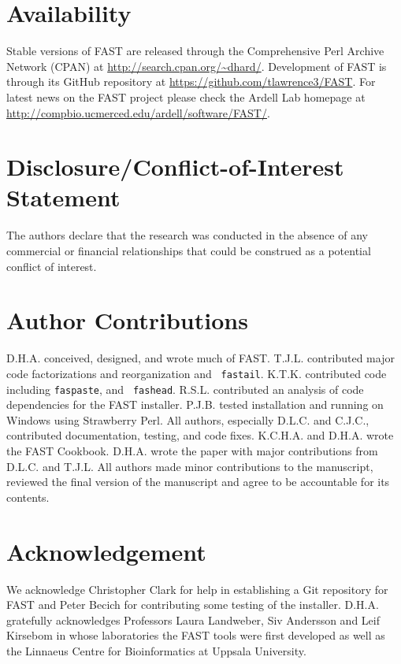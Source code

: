 \documentclass{frontiersSCNS} %
\begin{document}
\section*{Availability}

Stable versions of FAST are released through the Comprehensive Perl
Archive Network (CPAN) at
\url{http://search.cpan.org/~dhard/}. Development of FAST is through
its GitHub repository at \url{https://github.com/tlawrence3/FAST}. For
latest news on the FAST project please check the Ardell Lab homepage
at \url{http://compbio.ucmerced.edu/ardell/software/FAST/}.

\section*{Disclosure/Conflict-of-Interest Statement}

The authors declare that the research was conducted in the absence of
any commercial or financial relationships that could be construed as a
potential conflict of interest.

\section*{Author Contributions}

D.H.A. conceived, designed, and wrote much of FAST. T.J.L. contributed
major code factorizations and reorganization and {\tt
  fastail}. K.T.K. contributed code including {\tt faspaste}, and {\tt
  fashead}. R.S.L. contributed an analysis of code dependencies for
the FAST installer. P.J.B. tested installation and running on Windows
using Strawberry Perl. All authors, especially D.L.C. and C.J.C.,
contributed documentation, testing, and code fixes. K.C.H.A. and
D.H.A. wrote the FAST Cookbook. D.H.A. wrote the paper with major
contributions from D.L.C. and T.J.L. All authors made minor
contributions to the manuscript, reviewed the final version of the
manuscript and agree to be accountable for its contents.

\section*{Acknowledgement}
We acknowledge Christopher Clark for help in establishing a Git
repository for FAST and Peter Becich for contributing some testing of
the installer. D.H.A. gratefully acknowledges Professors Laura
Landweber, Siv Andersson and Leif Kirsebom in whose laboratories the
FAST tools were first developed as well as the Linnaeus Centre for
Bioinformatics at Uppsala University.
\end{document}
